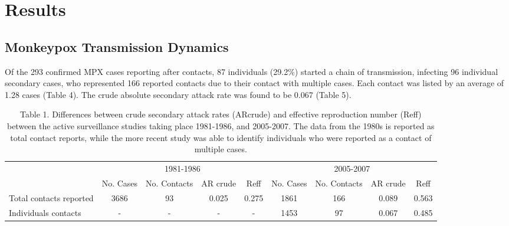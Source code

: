 \section{Results}

\subsection*{Monkeypox Transmission Dynamics}
Of the 293 confirmed MPX cases reporting after contacts, 87 individuals (29.2\%) started a chain of transmission, infecting 96 individual secondary cases, who represented 166 reported contacts due to their contact with multiple cases. Each contact was listed by an average of 1.28 cases (Table 4). The crude absolute secondary attack rate was found to be 0.067 (Table 5).


\begin{table}[!hb]
        \begin{tabular}{lcccccccc} 
        \toprule
         & \multicolumn{4}{c}{1981-1986} & \multicolumn{4}{c}{2005-2007} \\ %
\cmidrule(r){2-5} %
\cmidrule(l){6-9}
 & No. Cases & No. Contacts & AR crude & Reff & No. Cases & No. Contacts & AR crude & Reff\\ 
\midrule %
Total contacts reported & 3686 & 93 & 0.025 & 0.275 & 1861 & 166 & 0.089 & 0.563\\ 
Individuals contacts & - & - & - & - & 1453 & 97 & 0.067 & 0.485\\ 
\bottomrule
        \end{tabular}
           \caption{Table 1. Differences between crude secondary attack rates (ARcrude) and effective reproduction number (Reff) between the active surveillance studies taking place 1981-1986, and 2005-2007. The data from the 1980s is reported as total contact reports, while the more recent study was able to identify individuals who were reported as a contact of multiple cases.}
     \label{tab:table}
      \end{table}
      

